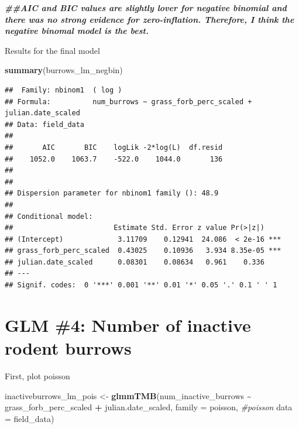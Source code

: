\documentclass[
]{article}
\newenvironment{Shaded}{\begin{snugshade}}{\end{snugshade}}
\newcommand{\AttributeTok}[1]{\textcolor[rgb]{0.13,0.29,0.53}{#1}}
\newcommand{\CommentTok}[1]{\textcolor[rgb]{0.56,0.35,0.01}{\textit{#1}}}
\newcommand{\DocumentationTok}[1]{\textcolor[rgb]{0.56,0.35,0.01}{\textbf{\textit{#1}}}}
\newcommand{\FunctionTok}[1]{\textcolor[rgb]{0.13,0.29,0.53}{\textbf{#1}}}
\newcommand{\NormalTok}[1]{#1}
\newcommand{\OtherTok}[1]{\textcolor[rgb]{0.56,0.35,0.01}{#1}}
\newcommand{\SpecialCharTok}[1]{\textcolor[rgb]{0.81,0.36,0.00}{\textbf{#1}}}
\begin{document}
\begin{Shaded}
\begin{Highlighting}[]
\DocumentationTok{\#\#AIC and BIC values are slightly lover for negative binomial and there was no strong evidence for zero{-}inflation. Therefore, I think the negative binomal model is the best. }
\end{Highlighting}
\end{Shaded}

Results for the final model

\begin{Shaded}
\begin{Highlighting}[]
\FunctionTok{summary}\NormalTok{(burrows\_lm\_negbin)}
\end{Highlighting}
\end{Shaded}

\begin{verbatim}
##  Family: nbinom1  ( log )
## Formula:          num_burrows ~ grass_forb_perc_scaled + julian.date_scaled
## Data: field_data
## 
##       AIC       BIC    logLik -2*log(L)  df.resid 
##    1052.0    1063.7    -522.0    1044.0       136 
## 
## 
## Dispersion parameter for nbinom1 family (): 48.9 
## 
## Conditional model:
##                        Estimate Std. Error z value Pr(>|z|)    
## (Intercept)             3.11709    0.12941  24.086  < 2e-16 ***
## grass_forb_perc_scaled  0.43025    0.10936   3.934 8.35e-05 ***
## julian.date_scaled      0.08301    0.08634   0.961    0.336    
## ---
## Signif. codes:  0 '***' 0.001 '**' 0.01 '*' 0.05 '.' 0.1 ' ' 1
\end{verbatim}

\section{GLM \#4: Number of inactive rodent
burrows}\label{glm-4-number-of-inactive-rodent-burrows}

First, plot poisson

\begin{Shaded}
\begin{Highlighting}[]
\NormalTok{inactiveburrows\_lm\_pois }\OtherTok{\textless{}{-}} \FunctionTok{glmmTMB}\NormalTok{(num\_inactive\_burrows }\SpecialCharTok{\textasciitilde{}}\NormalTok{ grass\_forb\_perc\_scaled }\SpecialCharTok{+} 
\NormalTok{                    julian.date\_scaled, }
                  \AttributeTok{family =}\NormalTok{ poisson, }\CommentTok{\#poisson}
                  \AttributeTok{data =}\NormalTok{ field\_data)}
\end{Highlighting}
\end{Shaded}
\end{document}
